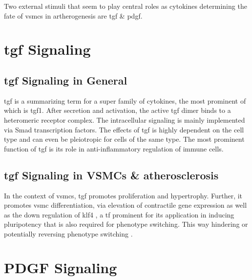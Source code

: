 Two external stimuli that seem to play central roles as cytokines determining the fate of \acp{vsmc} in artherogenesis are \ac{tgf} \& \ac{pdgf}.


\section{\ac{tgf} Signaling}
\label{sec:tgf}

    \subsection{\ac{tgf} Signaling in General}
    \label{subsec:tgf_the_cytokine}
    \ac{tgf} is a summarizing term for a super family of cytokines, the most prominent of which is \ac{tgf}1. After secretion and activation, the active \ac{tgf} dimer binds to a heteromeric receptor complex. The intracellular signaling is mainly implemented via Smad transcription factors. The effects of \ac{tgf} is highly dependent on the cell type and can even be pleiotropic for cells of the same type. The most prominent function of \ac{tgf} is its role in anti-inflammatory regulation of immune cells. \cite{goumansTGFvSignalingControl2018, batlleTransformingGrowthFactorv2019}

    \subsection{\ac{tgf} Signaling in VSMCs \& atherosclerosis}
    \label{subsec:pdf_signaling}
    In the context of \acp{vsmc}, \ac{tgf} promotes proliferation and hypertrophy. Further, it promotes \ac{vsmc} differentiation, via elevation of contractile gene expression as well as the down regulation of \ac{klf4} \cite{davis-dusenberyDownregulationKruppellikeFactor42011}, a \ac{tf} prominent for its application in inducing pluripotency \cite{takahashiInductionPluripotentStem2007} that is also required for phenotype switching. This way hindering \cite{davis-dusenberyDownregulationKruppellikeFactor42011} or potentially reversing phenotype switching \cite{panSingleCellGenomicsReveals2020}.

\section{PDGF Signaling}
\label{sec:pdgf}
